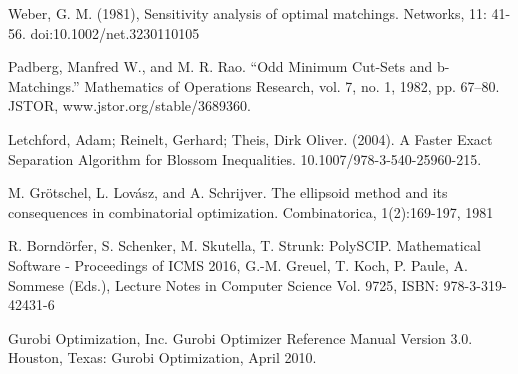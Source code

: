 \documentclass[twoside,a4paper,openright,12pt]{book}
\begin{document}
\begin{thebibliography}{9}
Weber, G. M. (1981), Sensitivity analysis of optimal matchings. Networks, 11: 41-56. doi:10.1002/net.3230110105

Padberg, Manfred W., and M. R. Rao. “Odd Minimum Cut-Sets and b-Matchings.” Mathematics of Operations Research, vol. 7, no. 1, 1982, pp. 67–80. JSTOR, www.jstor.org/stable/3689360.

Letchford, Adam;  Reinelt, Gerhard; Theis, Dirk Oliver. (2004). A Faster Exact Separation Algorithm for Blossom Inequalities. 10.1007/978-3-540-25960-215. 

M. Grötschel, L. Lovász, and A. Schrijver. The ellipsoid method and its
consequences in combinatorial optimization. Combinatorica, 1(2):169-197, 1981

R. Borndörfer, S. Schenker, M. Skutella, T. Strunk: PolySCIP.
Mathematical Software - Proceedings of ICMS 2016, G.-M. Greuel, T. Koch, P. Paule, A. Sommese (Eds.),
Lecture Notes in Computer Science Vol. 9725, ISBN: 978-3-319-42431-6

Gurobi Optimization, Inc. Gurobi Optimizer Reference Manual Version 3.0. Houston, Texas: Gurobi Optimization, April 2010.
\end{thebibliography}
\end{document}
